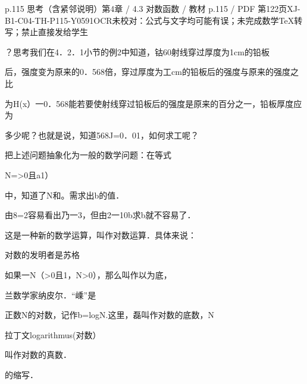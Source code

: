\begin{bankitem}{p.115 思考（含紧邻说明）}{第4章 / 4.3 对数函数 / 教材 p.115 / PDF 第122页}{XJ-B1-C04-TH-P115-Y0591}{OCR未校对：公式与文字均可能有误；未完成数学TeX转写；禁止直接发给学生}
\begin{ocrdraft}
\par
？思考我们在4．2．1小节的例2中知道，钴60射线穿过厚度为1cm的铅板
\par
后，强度变为原来的0．568倍，穿过厚度为工cm的铅板后的强度与原来的强度之比
\par
为H(x）一0．568能若要使射线穿过铅板后的强度是原来的百分之一，铅板厚度应为
\par
多少呢？也就是说，知道568J=0．01，如何求工呢？
\par
把上述问题抽象化为一般的数学问题：在等式
\par
N=>0且a1）
\par
中，知道了N和。需求出b的值．
\par
由8=2容易看出乃一3，但由2一10b求b就不容易了．
\par
这是一种新的数学运算，叫作对数运算．具体来说：
\par
对数的发明者是苏格
\par
如果一N（>0且1，N>0），那么叫作以为底，
\par
兰数学家纳皮尔．“嵊”是
\par
正数N的对数，记作b=logN.这里，磊叫作对数的底数，N
\par
拉丁文logarithmus(对数）
\par
叫作对数的真数．
\par
的缩写．
\end{ocrdraft}
\end{bankitem}
